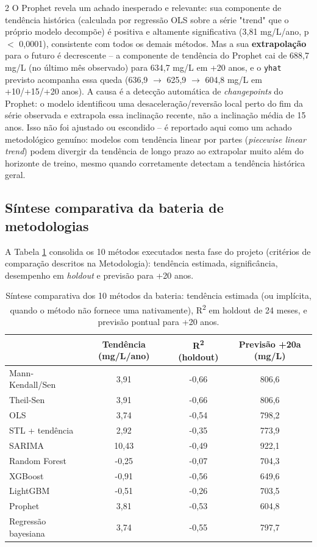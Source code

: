 \begin{multicols*}{2}
O Prophet revela um achado inesperado e relevante: sua componente de tendência histórica (calculada por regressão OLS sobre a série "trend" que o próprio modelo decompõe) é positiva e altamente significativa (3,81 mg/L/ano, p $<$ 0,0001), consistente com todos os demais métodos. Mas a sua \textbf{extrapolação} para o futuro é decrescente -- a componente de tendência do Prophet cai de 688,7 mg/L (no último mês observado) para 634,7 mg/L em +20 anos, e o \texttt{yhat} previsto acompanha essa queda (636,9 $\to$ 625,9 $\to$ 604,8 mg/L em +10/+15/+20 anos). A causa é a detecção automática de \textit{changepoints} do Prophet: o modelo identificou uma desaceleração/reversão local perto do fim da série observada e extrapola essa inclinação recente, não a inclinação média de 15 anos. Isso não foi ajustado ou escondido -- é reportado aqui como um achado metodológico genuíno: modelos com tendência linear por partes (\textit{piecewise linear trend}) podem divergir da tendência de longo prazo ao extrapolar muito além do horizonte de treino, mesmo quando corretamente detectam a tendência histórica geral.

\subsection{Síntese comparativa da bateria de metodologias}

A Tabela \ref{tab:sintese} consolida os 10 métodos executados nesta fase do projeto (critérios de comparação descritos na Metodologia): tendência estimada, significância, desempenho em \textit{holdout} e previsão para +20 anos.

\end{multicols*}
\begin{table}[H]
    \centering
    \begin{tabular}{l|c|c|c}
         & Tendência (mg/L/ano) & R\textsuperscript{2} (holdout) & Previsão +20a (mg/L) \\ \hline
        Mann-Kendall/Sen & 3,91 & -0,66 & 806,6 \\
        Theil-Sen & 3,91 & -0,66 & 806,6 \\
        OLS & 3,74 & -0,54 & 798,2 \\
        STL + tendência & 2,92 & -0,35 & 773,9 \\
        SARIMA & 10,43 & -0,49 & 922,1 \\
        Random Forest & -0,25 & -0,07 & 704,3 \\
        XGBoost & -0,91 & -0,56 & 649,6 \\
        LightGBM & -0,51 & -0,26 & 703,5 \\
        Prophet & 3,81 & -0,53 & 604,8 \\
        Regressão bayesiana & 3,74 & -0,55 & 797,7 \\
    \end{tabular}
    \caption{Síntese comparativa dos 10 métodos da bateria: tendência estimada (ou implícita, quando o método não fornece uma nativamente), R\textsuperscript{2} em holdout de 24 meses, e previsão pontual para +20 anos.}
    \label{tab:sintese}
\end{table}
